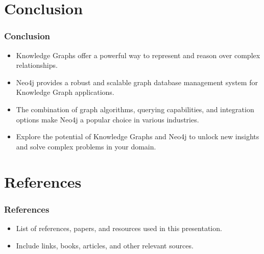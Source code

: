 \section{Conclusion}

\begin{frame}
  \frametitle{Conclusion}
  \begin{itemize}
    \item Knowledge Graphs offer a powerful way to represent and reason over complex relationships.
    \item Neo4j provides a robust and scalable graph database management system for Knowledge Graph applications.
    \item The combination of graph algorithms, querying capabilities, and integration options make Neo4j a popular choice in various industries.
    \item Explore the potential of Knowledge Graphs and Neo4j to unlock new insights and solve complex problems in your domain.
  \end{itemize}
\end{frame}

\section{References}

\begin{frame}
  \frametitle{References}
  \begin{itemize}
    \item List of references, papers, and resources used in this presentation.
    \item Include links, books, articles, and other relevant sources.
  \end{itemize}
\end{frame}